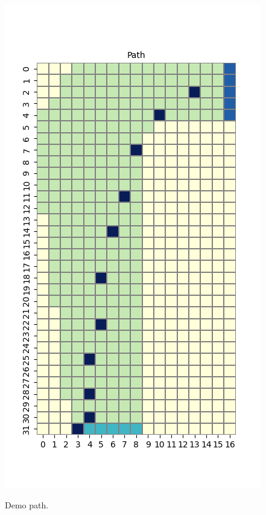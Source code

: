 \documentclass[11pt]{article}
\begin{document}
    \includegraphics[scale=0.7]{env2_demo_e_5_12_3}

    Demo path.
\end{document}
